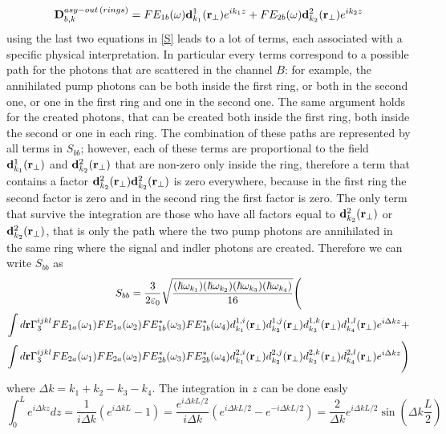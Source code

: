 \begin{equation}\mathbf{D}^{asy-out\,(rings)}_{b,k} = FE_{1b}(\omega) \mathbf{d}^1_{k_1}(\mathbf{r}_\perp)e^{ik_1z} + FE_{2b}(\omega)\mathbf{d}_{k_2}^2(\mathbf{r}_\perp)e^{ik_2z} \end{equation}
using the last two equations in \eqref{S} leads to a lot of terms, each associated with a specific physical interpretation. In particular every terms correspond to a possible path for the photons that are scattered in the channel $B$: for example, the annihilated pump photons can be both inside the first ring, or both in the second one, or one in the first ring and one in the second one. The same argument holds for the created photons, that can be created both inside the first ring, both inside the second or one in each ring. The combination of these paths are represented by all terms in $S_{bb}$; however, each of these terms are proportional to the field $\mathbf{d}^1_{k_1}(\mathbf{r}_{\perp})$ and $\mathbf{d}^2_{k_2}(\mathbf{r}_{\perp})$ that are non-zero only inside the ring, therefore a term that contains a factor $\mathbf{d}^2_{k_2}(\mathbf{r}_{\perp})\mathbf{d}^2_{k_2}(\mathbf{r}_{\perp})$ is zero everywhere, because in the first ring the second factor is zero and in the second ring the first factor is zero. The only term that survive the integration are those who have all factors equal to  $\mathbf{d}^2_{k_2}(\mathbf{r}_{\perp})$ or $\mathbf{d}^2_{k_2}(\mathbf{r}_{\perp})$, that is only the path where the two pump photons are annihilated in the same ring where the signal and indler photons are created. Therefore we can write $S_{bb}$ as
\begin{multline}S_{bb} =\frac{3}{2\varepsilon_0}\sqrt{\frac{(\hbar\omega_{k_1})(\hbar\omega_{k_2})(\hbar\omega_{k_3})(\hbar\omega_{k_4})}{16}}\Bigg( \\ \int d\mathbf{r} \Gamma^{ijkl}_3FE_{1a}(\omega_1)FE_{1a}(\omega_2)FE^*_{1b}(\omega_3)FE^*_{1b}(\omega_4)d^{1,i}_{k_1}(\mathbf{r}_{\perp})d^{1,j}_{k_2}(\mathbf{r}_{\perp})d^{1,k}_{k_3}(\mathbf{r}_{\perp})d^{1,l}_{k_4}(\mathbf{r}_{\perp})e^{i\Delta k z} +\\
\int d\mathbf{r} \Gamma^{ijkl}_3FE_{2a}(\omega_1)FE_{2a}(\omega_2)FE^*_{2b}(\omega_3)FE^*_{2b}(\omega_4)d^{2,i}_{k_1}(\mathbf{r}_{\perp})d^{2,j}_{k_2}(\mathbf{r}_{\perp})d^{2,k}_{k_3}(\mathbf{r}_{\perp})d^{2,l}_{k_4}(\mathbf{r}_{\perp})e^{i\Delta k z}\Bigg)\end{multline}
where $\Delta k = k_1 + k_2 -k_3 - k_4$. The integration in $z$ can be done easly
\begin{equation}\int_0^{L} e^{i\Delta k z} dz = \frac{1}{i\Delta k}(e^{i\Delta k L} - 1) = \frac{e^{i\Delta k L/2}}{i\Delta k}(e^{i\Delta k L/2}- e^{-i\Delta k L/2}) = \frac{2}{\Delta k}e^{i\Delta k L/2} \sin\left(\Delta k \frac{L}{2}\right)\end{equation}
